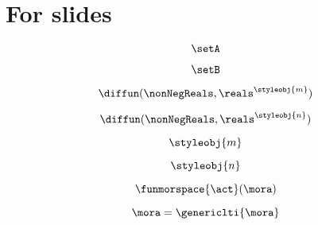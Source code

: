 
\section[For slides]{For slides}

\begin{forslides}

    \begin{equation}
        \label{eq:systems-000}
        \setA
    \end{equation}

    \begin{equation}
        \label{eq:systems-001}
        \setB
    \end{equation}

    \begin{equation}
        \label{eq:systems-002}
        \diffun(\nonNegReals, \reals^\styleobj{m})
    \end{equation}

    \begin{equation}
        \label{eq:systems-003}
        \diffun(\nonNegReals, \reals^\styleobj{n})
    \end{equation}

    \begin{equation}
        \label{eq:systems-004}
        \styleobj{m}
    \end{equation}

    \begin{equation}
        \label{eq:systems-005}
        \styleobj{n}
    \end{equation}

    \begin{equation}
        \label{eq:systems-006}
        \funmorspace{\act}(\mora)
    \end{equation}

    \begin{equation}
        \label{eq:systems-007}
        \mora = \genericlti{\mora}
    \end{equation}

    \begin{comment}
    \begin{equation}
        \label{eq:systems-008}
        \projB(\tup{\ela,\elb}) = \elb
    \end{equation}

    \begin{equation}
        \label{eq:systems-009}
        \elna{1},\elna{2}\setin \reals
    \end{equation}


\end{comment}
\end{forslides}
